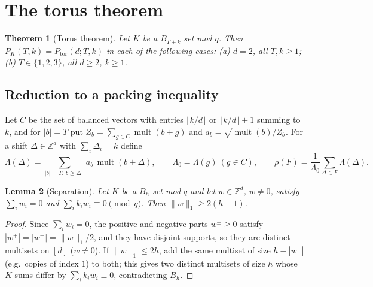 \documentclass[11pt]{article}
\newcommand{\Z}{\mathbb{Z}}
\newcommand{\mult}{\operatorname{mult}}
\newcommand{\Ptor}{P_{\mathrm{tor}}}
\newtheorem{theorem}{Theorem}
\newtheorem{lemma}[theorem]{Lemma}
\theoremstyle{definition}
\theoremstyle{remark}
\begin{document}
\section{The torus theorem}\label{sec:torus}
\begin{theorem}[Torus theorem]\label{thm:torus}
Let $K$ be a $B_{T+k}$ set mod $q$. Then $P_K(T,k)=\Ptor(d;T,k)$ in each of the following cases:
(a) $d=2$, all $T,k\ge1$;\quad (b) $T\in\{1,2,3\}$, all $d\ge2$, $k\ge1$.
\end{theorem}

\subsection{Reduction to a packing inequality}
Let $C$ be the set of balanced vectors with entries $\lfloor k/d\rfloor$ or $\lfloor k/d\rfloor+1$ summing to $k$, and for
$|b|=T$ put $Z_b=\sum_{g\in C}\mult(b+g)$ and $a_b=\sqrt{\mult(b)/Z_b}$. For a shift $\Delta\in\Z^d$ with $\sum_i\Delta_i=k$ define
\[
\Lambda(\Delta)=\sum_{|b|=T,\ b\ge\Delta^-}a_b\,\mult(b+\Delta),\qquad \Lambda_0=\Lambda(g)\ (g\in C),\qquad
\rho(F)=\frac{1}{\Lambda_0}\sum_{\Delta\in F}\Lambda(\Delta).
\]
\begin{lemma}[Separation]\label{lem:sep}
Let $K$ be a $B_h$ set mod $q$ and let $w\in\Z^d$, $w\ne0$, satisfy $\sum_iw_i=0$ and $\sum_ik_iw_i\equiv0\pmod q$. Then
$\lVert w\rVert_1\ge2(h+1)$.
\end{lemma}
\begin{proof}
Since $\sum_iw_i=0$, the positive and negative parts $w^\pm\ge0$ satisfy $|w^+|=|w^-|=\lVert w\rVert_1/2$, and they have disjoint
supports, so they are distinct multisets on $[d]$ ($w\ne0$). If $\lVert w\rVert_1\le2h$, add the same multiset of size $h-|w^+|$
(e.g.\ copies of index $1$) to both; this gives two distinct multisets of size $h$ whose $K$-sums differ by $\sum_ik_iw_i\equiv0$,
contradicting $B_h$.
\end{proof}
\end{document}
